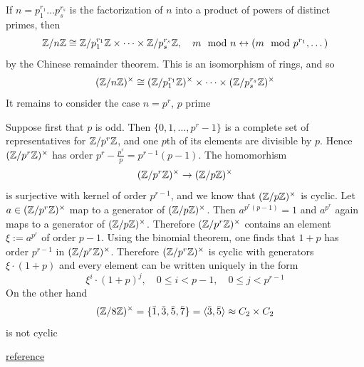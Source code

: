 \documentclass[11pt]{article}
\begin{document}
If \(n=p_1^{r_1}\dots p_s^{r_s}\) is the factorization of \(n\) into a product of powers of distinct
primes, then
\begin{equation*}
\mathbb{Z}/n\mathbb{Z}\cong\mathbb{Z}/p_1^{r_1}\mathbb{Z}\times\dots\times\mathbb{Z}/p_s^{r_s}\mathbb{Z},\quad m\mod n\leftrightarrow(m\mod p^{r_1},\dots)
\end{equation*}
by the Chinese remainder theorem. This is an isomorphism of rings, and so
\begin{equation*}
(\mathbb{Z}/n\mathbb{Z})^\times\cong(\mathbb{Z}/p_1^{r_1}\mathbb{Z})^{\times}\times\dots\times(\mathbb{Z}/p_s^{r_s}\mathbb{Z})^{\times}
\end{equation*}
It remains to consider the case \(n=p^r\), \(p\) prime

Suppose first that \(p\) is odd. Then \(\{0,1,\dots,p^r-1\}\) is a complete set of representatives
for \(\mathbb{Z}/p^r\mathbb{Z}\), and one \(p\)th of its elements are divisible by \(p\). Hence \((\mathbb{Z}/p^r\mathbb{Z})^{\times}\) has
order \(p^r-\frac{p^r}{p}=p^{r-1}(p-1)\). The homomorhism
\begin{equation*}
(\mathbb{Z}/p^r\mathbb{Z})^\times\to(\mathbb{Z}/p\mathbb{Z})^\times
\end{equation*}
is surjective with kernel of order \(p^{r-1}\), and we know that \((\mathbb{Z}/p\mathbb{Z})^\times\) is cyclic.
Let \(a\in(\mathbb{Z}/p^r\mathbb{Z})^\times\) map to a generator of \((\mathbb{Z}/p\mathbb{Z})^\times\). Then \(a^{p^r(p-1)}=1\) and \(a^{p^r}\)
again maps to a generator of \((\mathbb{Z}/p\mathbb{Z})^\times\). Therefore \((\mathbb{Z}/p^r\mathbb{Z})^\times\) contains an
element \(\xi:=a^{p^r}\) of order \(p-1\). Using the binomial theorem, one finds that \(1+p\) has
order \(p^{r-1}\) in \((\mathbb{Z}/p^r\mathbb{Z})^\times\). Therefore \((\mathbb{Z}/p^r\mathbb{Z})^\times\) is cyclic with
generators \(\xi\cdot(1+p)\) and every element can be written uniquely in the form
\begin{equation*}
\xi^i\cdot(1+p)^j,\quad 0\le i<p-1,\quad 0\le j<p^{r-1}
\end{equation*}
On the other hand
\begin{equation*}
(\Z/8\Z)^\times=\{\bbar{1},\bbar{3},\bbar{5},\bbar{7}\}=\la\bbar{3},\bbar{5}\ra\approx C_2\times C_2
\end{equation*}
is not cyclic

\href{http://ramanujan.math.trinity.edu/rdaileda/teach/s18/m3341/ZnZ.pdf}{reference}
\end{document}
